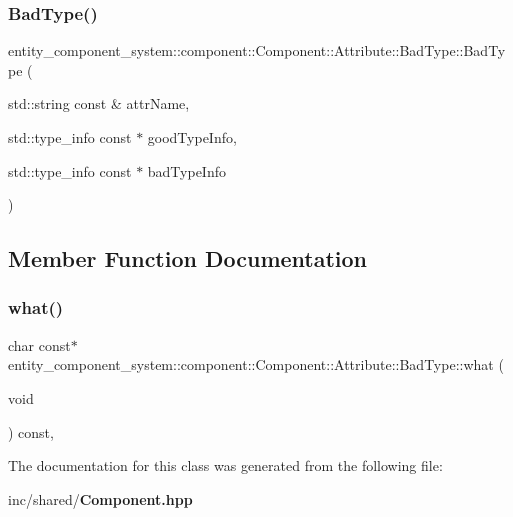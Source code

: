 \subsubsection{Bad\+Type()}
{\footnotesize\ttfamily entity\+\_\+component\+\_\+system\+::component\+::\+Component\+::\+Attribute\+::\+Bad\+Type\+::\+Bad\+Type (\begin{DoxyParamCaption}\item[{std\+::string const \&}]{attr\+Name,  }\item[{std\+::type\+\_\+info const $\ast$}]{good\+Type\+Info,  }\item[{std\+::type\+\_\+info const $\ast$}]{bad\+Type\+Info }\end{DoxyParamCaption})\hspace{0.3cm}{\ttfamily [inline]}}



\subsection{Member Function Documentation}
\label{classentity__component__system_1_1component_1_1_component_1_1_attribute_1_1_bad_type_a67a9eb74ffeb8fbceb96b70d79d8c627} 
\subsubsection{what()}
{\footnotesize\ttfamily char const$\ast$ entity\+\_\+component\+\_\+system\+::component\+::\+Component\+::\+Attribute\+::\+Bad\+Type\+::what (\begin{DoxyParamCaption}\item[{void}]{ }\end{DoxyParamCaption}) const\hspace{0.3cm}{\ttfamily [inline]}, {\ttfamily [noexcept]}}



The documentation for this class was generated from the following file\+:\begin{DoxyCompactItemize}
\item 
inc/shared/{\bf Component.\+hpp}\end{DoxyCompactItemize}
